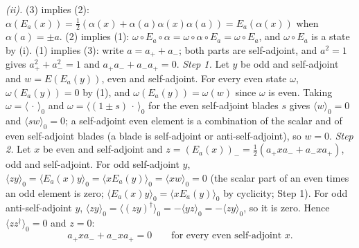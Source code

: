 \emph{(ii).} (3) implies (2): $\alpha(E_{a}(x)) = \tfrac12(\alpha(x) + \alpha(a)\alpha(x)\alpha(a)) = E_{a}(\alpha(x))$ when $\alpha(a) = \pm a$. (2) implies (1): $\omega \circ E_{a} \circ \alpha = \omega \circ \alpha \circ E_{a} = \omega \circ E_{a}$, and $\omega \circ E_{a}$ is a state by (i). (1) implies (3): write $a = a_{+} + a_{-}$; both parts are self-adjoint, and $a^{2} = 1$ gives $a_{+}^{2} + a_{-}^{2} = 1$ and $a_{+}a_{-} + a_{-}a_{+} = 0$. \emph{Step 1.} Let $y$ be odd and self-adjoint and $w = E(E_{a}(y))$, even and self-adjoint. For every even state $\omega$, $\omega(E_{a}(y)) = 0$ by (1), and $\omega(E_{a}(y)) = \omega(w)$ since $\omega$ is even. Taking $\omega = \langle\,\cdot\,\rangle_{0}$ and $\omega = \langle(1 \pm s)\,\cdot\,\rangle_{0}$ for the even self-adjoint blades $s$ gives $\langle w\rangle_{0} = 0$ and $\langle sw\rangle_{0} = 0$; a self-adjoint even element is a combination of the scalar and of even self-adjoint blades (a blade is self-adjoint or anti-self-adjoint), so $w = 0$. \emph{Step 2.} Let $x$ be even and self-adjoint and $z = (E_{a}(x))_{-} = \tfrac12(a_{+}xa_{-} + a_{-}xa_{+})$, odd and self-adjoint. For odd self-adjoint $y$, $\langle zy\rangle_{0} = \langle E_{a}(x)y\rangle_{0} = \langle xE_{a}(y)\rangle_{0} = \langle xw\rangle_{0} = 0$ (the scalar part of an even times an odd element is zero; $\langle E_{a}(x)y\rangle_{0} = \langle xE_{a}(y)\rangle_{0}$ by cyclicity; Step 1). For odd anti-self-adjoint $y$, $\langle zy\rangle_{0} = \langle(zy)^{\dagger}\rangle_{0} = -\langle yz\rangle_{0} = -\langle zy\rangle_{0}$, so it is zero. Hence $\langle zz^{\dagger}\rangle_{0} = 0$ and $z = 0$:
\[
a_{+}xa_{-} + a_{-}xa_{+} = 0 \qquad \text{for every even self-adjoint } x . \tag{$*$}
\]
